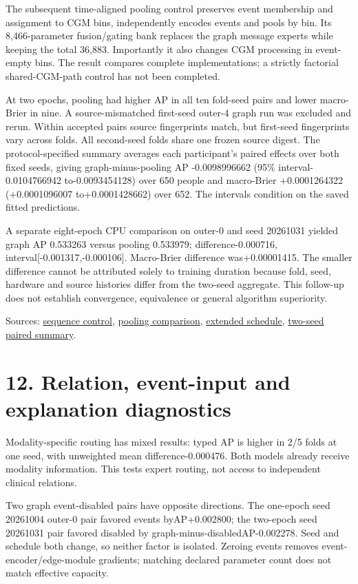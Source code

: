 \documentclass[11pt,a4paper]{article}
\begin{document}
The subsequent time-aligned pooling control preserves event membership and assignment to CGM bins, independently encodes events and pools by bin. Its 8,466-parameter fusion/gating bank replaces the graph message experts while keeping the total 36,883. Importantly it also changes CGM processing in event-empty bins. The result compares complete implementations; a strictly factorial shared-CGM-path control has not been completed.

At two epochs, pooling had higher AP in all ten fold-seed pairs and lower macro-Brier in nine. A source-mismatched first-seed outer-4 graph run was excluded and rerun. Within accepted pairs source fingerprints match, but first-seed fingerprints vary across folds. All second-seed folds share one frozen source digest. The protocol-specified summary averages each participant's paired effects over both fixed seeds, giving graph-minus-pooling AP -0.0098996662 (95\% interval-0.0104766942 to-0.0093454128) over 650 people and macro-Brier +0.0001264322 (+0.0001096007 to+0.0001428662) over 652. The intervals condition on the saved fitted predictions.

A separate eight-epoch CPU comparison on outer-0 and seed 20261031 yielded graph AP 0.533263 versus pooling 0.533979; difference-0.000716, interval[-0.001317,-0.000106]. Macro-Brier difference was+0.00001415. The smaller difference cannot be attributed solely to training duration because fold, seed, hardware and source histories differ from the two-seed aggregate. This follow-up does not establish convergence, equivalence or general algorithm superiority.

Sources: \href{loop_non_graph_capacity_matched_control.md}{sequence control}, \href{loop_time_aligned_nongraph_control.md}{pooling comparison}, \href{loop_extended_schedule_protocol_2026_10_31.md}{extended schedule}, \href{../audit/loop_graph_vs_aligned_nongraph_two_seed_five_fold_participant_summary.json}{two-seed paired summary}.

\section*{12. Relation, event-input and explanation diagnostics}
Modality-specific routing has mixed results: typed AP is higher in 2/5 folds at one seed, with unweighted mean difference-0.000476. Both models already receive modality information. This tests expert routing, not access to independent clinical relations.

Two graph event-disabled pairs have opposite directions. The one-epoch seed 20261004 outer-0 pair favored events byAP+0.002800; the two-epoch seed 20261031 pair favored disabled by graph-minus-disabledAP-0.002278. Seed and schedule both change, so neither factor is isolated. Zeroing events removes event-encoder/edge-module gradients; matching declared parameter count does not match effective capacity.
\end{document}
